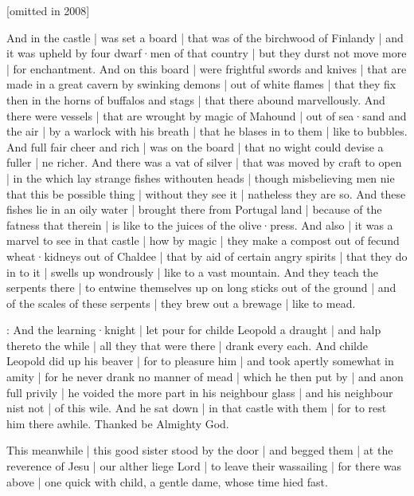
[omitted in 2008]

And in the castle |
was set a board |
that was of the birchwood of Finlandy |
and it was upheld by four dwarf·men of that country |
but they durst not move more |
for enchantment.
And on this board |
were frightful swords and knives |
that are made in a great cavern by swinking demons |
out of white flames |
that they fix then in the horns of buffalos and stags |
that there abound marvellously.
And there were vessels |
that are wrought by magic of Mahound |
out of sea·sand and the air |
by a warlock with his breath |
that he blases in to them |
like to bubbles.
And full fair cheer and rich |
was on the board |
that no wight could devise a fuller |
ne richer.
And there was a vat of silver |
that was moved by craft to open |
in the which lay strange fishes withouten heads |
though misbelieving men nie that this be possible thing |
without they see it |
natheless they are so.
And these fishes lie in an oily water |
brought there from Portugal land |
because of the fatness that therein |
is like to the juices of the olive·press.
And also |
it was a marvel to see in that castle |
how by magic |
they make a compost out of fecund wheat·kidneys out of Chaldee |
that by aid of certain angry spirits |
that they do in to it |
swells up wondrously |
like to a vast mountain.
And they teach the serpents there |
to entwine themselves up on long sticks out of the ground |
and of the scales of these serpents |
they brew out a brewage |
like to mead.


:
And the learning·knight |
let pour for childe Leopold a draught |
and halp thereto the while |
all they that were there |
drank every each.
And childe Leopold did up his beaver |
for to pleasure him |
and took apertly somewhat in amity |
for he never drank no manner of mead |
which he then put by |
and anon full privily |
he voided the more part in his neighbour glass |
and his neighbour nist not |
of this wile.
And he sat down |
in that castle with them |
for to rest him there awhile.
Thanked be Almighty God.



This meanwhile |
this good sister stood by the door |
and begged them |
at the reverence of Jesu |
our alther liege Lord |
to leave their wassailing |
for there was above |
one quick with child,
a gentle dame,
whose time hied fast.

